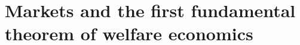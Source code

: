 \documentclass[a4paper,12pt]{article}
\begin{document}
\begin{enumerate}
\begin{enumerate}
    \end{enumerate}
    
\end{enumerate}

\section{Markets and the first fundamental theorem of welfare economics}
\label{sec:mark-first-fund}
\end{document}
